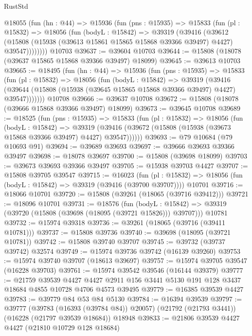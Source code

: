 \begin{lexlean}{RustStd}
\begin{coremodule}
    @18055
      (fun (hn : @44) =>
      @15936
        (fun (pns : @15935) =>
        @15833
          (fun (pl : @15832) =>
          @18056
            (fun (bodyL : @15842) =>
            @39319
              (@39416
                (@39612
                  (@15808 (@15938 (@39613 @15861 @15865 @15868 @39366 @39497) @4427) @39547))))))))
    @10703
@39637 := @39604 @10703
@39644 := @15808 (@18078 (@39637 @15865 @15868 @39366 @39497) @18099)
@39645 := @39613 @10703
@39665 := @18495
    (fun (hn : @44) =>
    @15936
      (fun (pns : @15935) =>
      @15833
        (fun (pl : @15832) =>
        @18056
          (fun (bodyL : @15842) =>
          @39319
            (@39416
              (@39644 (@15808 (@15938 (@39645 @15865 @15868 @39366 @39497) @4427) @39547)))))))
    @10708
@39666 := @39637 @10708
@39672 := @15808 (@18078 (@39666 @15868 @39366 @39497) @18099)
@39673 := @39645 @10708
@39689 := @18525
    (fun (pns : @15935) =>
    @15833
      (fun (pl : @15832) =>
      @18056
        (fun (bodyL : @15842) =>
        @39319 (@39416 (@39672 (@15808 (@15938 (@39673 @15868 @39366 @39497) @4427) @39547))))))
@39693 := @79 @10684 (@79 @10693 @91)
@39694 := @39689 @39693
@39697 := @39666 @39693 @39366 @39497
@39698 := @18078 @39697
@39700 := @15808 (@39698 @18099)
@39703 := @39673 @39693 @39366 @39497
@39705 := @15938 @39703 @4427
@39707 := @15808 @39705 @39547
@39715 := @16023
    (fun (pl : @15832) => @18056 (fun (bodyL : @15842) => @39319 (@39416 (@39700 @39707))))
    @10701
@39716 := @18066 @10701
@39720 := @15808 (@39261 (@18065 (@39716 @39412)))
@39721 := @18096 @10701
@39731 := @18576
    (fun (bodyL : @15842) => @39319 (@39720 (@15808 (@39698 (@18095 (@39721 @15826))) @39707)))
    @10781
@39732 := @15974 @39318
@39736 := @39261 (@18065 (@39716 (@39411 @10781)))
@39737 := @15808 @39736
@39740 := @39698 (@18095 (@39721 @10781))
@39742 := @15808 @39740 @39707
@39745 := @39732 (@39737 @39742) @32574
@39749 := @15974 @39736 @39742 (@16139 @39260)
@39753 := @15974 @39740 @39707 (@18613 @39697)
@39757 := @15974 @39705 @39547 (@16228 @39703)
@39761 := @15974 @39542 @39546 (@16144 @39379)
@39777 := @21759
    @39539
    @4427
    @4427
    @2911
    @156
    @3441
    @5130
    @191
    @128
    @3437
    @18684
    @4855
    @10728
    @4706
    @4573
    @39495
@39779 := @16385 @39539 @4427
@39783 := @39779 @84 @53 @84 @5130
@39784 := @16394 @39539
@39797 := @39777
    (@39783 (@16393 (@39784 @84)) @20057)
    (@21792 (@21793 @3441))
    (@16228 (@21797 @39539 @18684))
    @18948
@39833 := @21806
    @39539
    @4427
    @4427
    (@21810 @10729 @128 @18684)

\end{coremodule}
\end{lexlean}
